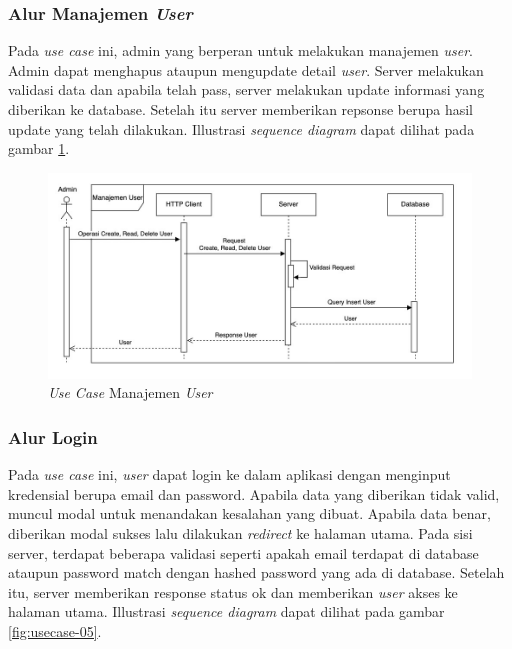 \subsubsection{Alur Manajemen \textit{User}}

Pada \textit{use case} ini, admin yang berperan untuk melakukan manajemen \textit{user}. Admin dapat menghapus ataupun mengupdate detail \textit{user}. Server melakukan validasi data dan apabila telah pass, server melakukan update informasi yang diberikan ke database. Setelah itu server memberikan repsonse berupa hasil update yang telah dilakukan. Illustrasi \textit{sequence diagram} dapat dilihat pada gambar \ref{fig:usecase-04}.

\begin{figure}[ht]
  \centering
  \includegraphics[width=1\textwidth]{resources/chapter-3/usecase/uc-04.jpg}
  \caption{\textit{Use Case} Manajemen \textit{User}}
  \label{fig:usecase-04}
\end{figure}

\subsubsection{Alur Login}

Pada \textit{use case} ini, \textit{user} dapat login ke dalam aplikasi dengan menginput kredensial berupa email dan password. Apabila data yang diberikan tidak valid, muncul modal untuk menandakan kesalahan yang dibuat. Apabila data benar, diberikan modal sukses lalu dilakukan \textit{redirect} ke halaman utama. Pada sisi server, terdapat beberapa validasi seperti apakah email terdapat di database ataupun password match dengan hashed password yang ada di database. Setelah itu, server memberikan response status ok dan memberikan \textit{user} akses ke halaman utama. Illustrasi \textit{sequence diagram} dapat dilihat pada gambar \ref{fig:usecase-05}.

